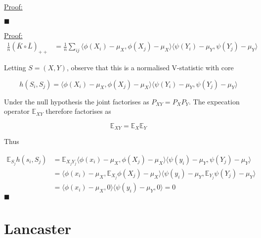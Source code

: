 \documentclass{article}
\newenvironment{claimproof}[1]{\par\noindent\underline{Proof:}\space#1}{\hfill $\blacksquare$}
\begin{document}
\begin{claimproof}[2]

\end{claimproof}

\begin{claimproof}[3]
\begin{align*}
\frac{1}{n}(\bar{K}\circ \bar{L})_{++} & = \frac{1}{n}\sum_{ij} \langle \phi(X_i) - \mu_X,\phi(X_j) -\mu_X \rangle \langle \psi(Y_i) - \mu_Y,\psi(Y_j) -\mu_Y \rangle 
\end{align*}

Letting $S=(X,Y)$, observe that this is a normalised V-statistic with core 

\[h(S_i,S_j) = \langle \phi(X_i) - \mu_X,\phi(X_j) -\mu_X \rangle \langle \psi(Y_i) - \mu_Y,\psi(Y_j) -\mu_Y \rangle \]

Under the null hypothesis the joint factorises as $P_{XY} = P_XP_Y$. The expecation operator $\mathbb{E}_{XY}$ therefore factorises as

\[\mathbb{E}_{XY} = \mathbb{E}_{X}\mathbb{E}_{Y}\]

Thus 

\begin{align*}
\mathbb{E}_{S_j}h(s_i,S_j) &= \mathbb{E}_{X_jY_j}\langle \phi(x_i) - \mu_X,\phi(X_j) -\mu_X \rangle \langle \psi(y_i) - \mu_Y,\psi(Y_j) -\mu_Y \rangle \\&=
\langle \phi(x_i) - \mu_X,\mathbb{E}_{X_j}\phi(X_j) -\mu_X \rangle  \langle \psi(y_i) - \mu_Y,\mathbb{E}_{Y_j}\psi(Y_j) -\mu_Y \rangle \\&=
\langle \phi(x_i) - \mu_X,0 \rangle  \langle \psi(y_i) - \mu_Y,0 \rangle = 0
\end{align*}
\end{claimproof}


\section{Lancaster}
\end{document}
